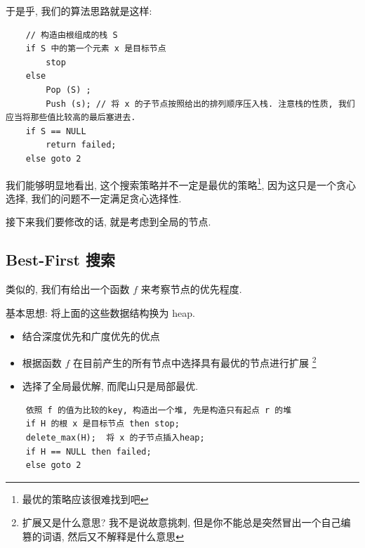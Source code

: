 \documentclass[a4paper, 10pt]{ctexart} %
\begin{document}
于是乎, 我们的算法思路就是这样:
\begin{verbatim}
    // 构造由根组成的栈 S
    if S 中的第一个元素 x 是目标节点
        stop
    else 
        Pop (S) ; 
        Push (s); // 将 x 的子节点按照给出的排列顺序压入栈. 注意栈的性质, 我们应当将那些值比较高的最后塞进去.
    if S == NULL 
        return failed;
    else goto 2
\end{verbatim}

我们能够明显地看出, 这个搜索策略并不一定是最优的策略\footnote{最优的策略应该很难找到吧}, 因为这只是一个贪心选择, 我们的问题不一定满足贪心选择性. 

接下来我们要修改的话, 就是考虑到全局的节点.
\subsection{Best-First 搜索}

类似的, 我们有给出一个函数 $f$ 来考察节点的优先程度.

基本思想: 将上面的这些数据结构换为 heap.
\begin{itemize}
    \item 结合深度优先和广度优先的优点
    \item 根据函数 $f$ 在目前产生的所有节点中选择具有最优的节点进行扩展 \footnote{扩展又是什么意思? 我不是说故意挑刺, 但是你不能总是突然冒出一个自己编篡的词语, 然后又不解释是什么意思}
    \item 选择了全局最优解, 而爬山只是局部最优.
\end{itemize}
\begin{verbatim}
    依照 f 的值为比较的key, 构造出一个堆, 先是构造只有起点 r 的堆
    if H 的根 x 是目标节点 then stop;
    delete_max(H);  将 x 的子节点插入heap;
    if H == NULL then failed;
    else goto 2
\end{verbatim}
\end{document}
